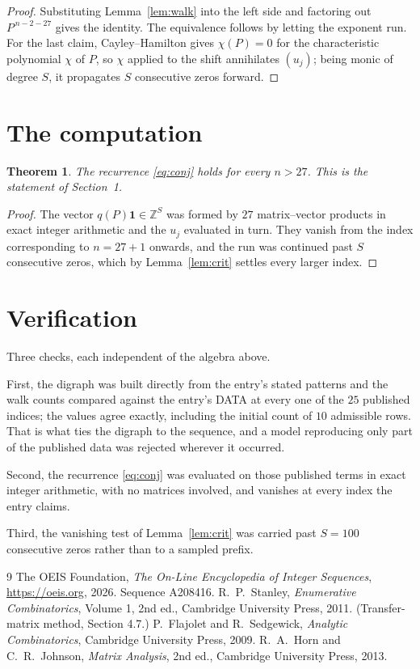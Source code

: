 \documentclass[11pt,a4paper]{article}
\theoremstyle{plain}
\newtheorem{theorem}{Theorem}
\theoremstyle{definition}
\begin{document}
\begin{proof}
Substituting Lemma~\ref{lem:walk} into the left side and factoring out
$P^{\,n-2-27}$ gives the identity. The equivalence follows by letting the exponent
run. For the last claim, Cayley--Hamilton gives $\chi(P)=0$ for the characteristic
polynomial $\chi$ of $P$, so $\chi$ applied to the shift annihilates $(u_j)$; being monic of
degree $S$, it propagates $S$ consecutive zeros forward.
\end{proof}

\section{The computation}

\begin{theorem}
The recurrence \eqref{eq:conj} holds for every $n>27$. This is the statement of
Section~1.
\end{theorem}

\begin{proof}
The vector $q(P)\mathbf{1}\in\mathbb{Z}^{S}$ was formed by $27$ matrix--vector
products in exact integer arithmetic and the $u_j$ evaluated in turn. They vanish from the
index corresponding to $n=27+1$ onwards, and the run was continued past $S$ consecutive
zeros, which by Lemma~\ref{lem:crit} settles every larger index.
\end{proof}

\section{Verification}

Three checks, each independent of the algebra above.

First, the digraph was built directly from the entry's stated patterns and the walk counts
compared against the entry's DATA at every one of the $25$ published indices; the
values agree exactly, including the initial count of $10$ admissible rows. That is
what ties the digraph to the sequence, and a model reproducing only part of the published
data was rejected wherever it occurred.

Second, the recurrence \eqref{eq:conj} was evaluated on those published terms in exact
integer arithmetic, with no matrices involved, and vanishes at every index the entry claims.

Third, the vanishing test of Lemma~\ref{lem:crit} was carried past $S=100$ consecutive
zeros rather than to a sampled prefix.

\begin{thebibliography}{9}
 The OEIS Foundation, \emph{The On-Line Encyclopedia of Integer
Sequences}, \url{https://oeis.org}, 2026. Sequence A208416.
 R.~P.~Stanley, \emph{Enumerative Combinatorics}, Volume 1, 2nd ed.,
Cambridge University Press, 2011. (Transfer-matrix method, Section 4.7.)
 P.~Flajolet and R.~Sedgewick, \emph{Analytic Combinatorics}, Cambridge
University Press, 2009.
 R.~A.~Horn and C.~R.~Johnson, \emph{Matrix Analysis}, 2nd ed., Cambridge
University Press, 2013.
\end{thebibliography}
\end{document}
